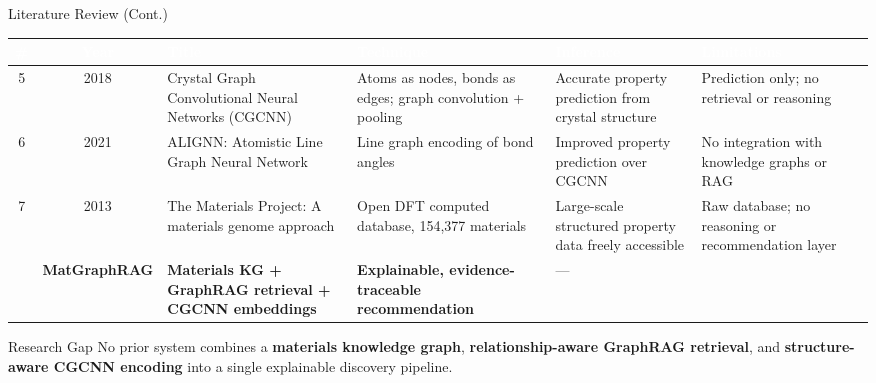 \documentclass{beamer}
\begin{document}
\begin{frame}{Literature Review (Cont.)}
\scriptsize
\setlength{\tabcolsep}{3pt}
\renewcommand{\arraystretch}{1.25}

\begin{tabular}{|c|c|p{2.8cm}|p{2.5cm}|p{2.4cm}|p{2.2cm}|}
\hline
\rowcolor{blue!70}
\textcolor{white}{\textbf{\#}} &
\textcolor{white}{\textbf{Year}} &
\textcolor{white}{\textbf{Title}} &
\textcolor{white}{\textbf{Technique}} &
\textcolor{white}{\textbf{Inference}} &
\textcolor{white}{\textbf{Limitations}} \\
\hline

\rowcolor{blue!8}
5 & 2018 &
Crystal Graph Convolutional Neural Networks (CGCNN) &
Atoms as nodes, bonds as edges; graph convolution + pooling &
Accurate property prediction from crystal structure &
Prediction only; no retrieval or reasoning \\
\hline

6 & 2021 &
ALIGNN: Atomistic Line Graph Neural Network &
Line graph encoding of bond angles &
Improved property prediction over CGCNN &
No integration with knowledge graphs or RAG \\
\hline

\rowcolor{blue!8}
7 & 2013 &
The Materials Project: A materials genome approach &
Open DFT computed database, 154,377 materials &
Large-scale structured property data freely accessible &
Raw database; no reasoning or recommendation layer \\
\hline

\rowcolor{blue!25}
\multicolumn{2}{|c|}{\textbf{Ours}} &
\textbf{MatGraphRAG} &
\textbf{Materials KG + GraphRAG retrieval + CGCNN embeddings} &
\textbf{Explainable, evidence-traceable recommendation} &
--- \\
\hline

\end{tabular}

\vspace{0.2cm}

\begin{block}{Research Gap}
No prior system combines a \textbf{materials knowledge graph}, \textbf{relationship-aware GraphRAG retrieval}, and \textbf{structure-aware CGCNN encoding} into a single explainable discovery pipeline.
\end{block}

\end{frame}
\end{document}
